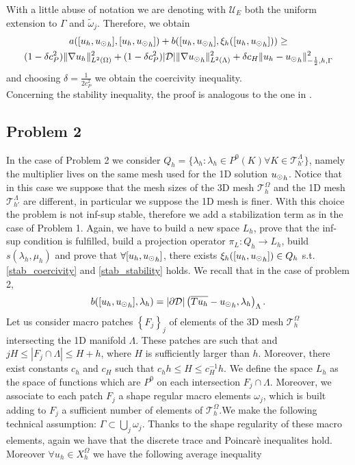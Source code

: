 With a little abuse of notation we are denoting with $\mathcal{U}_E$ both the uniform extension to $\Gamma$ and $\tilde{\omega}_j$. Therefore, we obtain
\begin{multline*}
a([u_h, {u_{\odot}}_h],[u_h, {u_{\odot}}_h] ) + b([u_h, {u_{\odot}}_h], \xi_h([u_h, {u_{\odot}}_h]))
\geq \\
(1-\delta c_P^2) \|\nabla u_h\|^2_{L^2(\Omega)} + (1- \delta c_P^2) |\mathcal{D}|\|\nabla {u_{\odot}}_h\|^2_{L^2(\Lambda)}
+\delta c_H \|u_h-{u_{\odot}}_h\|^2_{-\frac 12,h,\Gamma}
\end{multline*}
and choosing $\delta=\frac{1}{2c_P^2}$ we obtain the coercivity inequality.\\
Concerning the stability inequality, the proof is analogous to the one in \cite{burman2014}.

\subsection{Problem 2} In the case of Problem 2 we consider $Q_h=\{\lambda_{h} : \lambda_h \in P^0(K) \forall K \in \mathcal{T}^{\Lambda}_{h'}\}$, namely the multiplier lives on the same mesh used for the 1D solution ${u_{\odot}}_h$. Notice that in this case we suppose that the mesh sizes of the 3D mesh $	\mathcal{T}^{\Omega}_h$ and the 1D mesh $\mathcal{T}^{\Lambda}_{h'}$ are different, in particular we suppose the 1D mesh is finer. With this choice the problem is not inf-sup stable, therefore we add a stabilization term as in the case of Problem 1. Again, we have to build a new space $L_h$, prove that the inf-sup condition is fulfilled, build a projection operator $\pi_L: Q_h \rightarrow L_h$, build $s(\lambda_h, \mu_h)$ and prove that $\forall [u_h, {u_{\odot}}_h]$, there exists $\xi_h([u_h, {u_{\odot}}_h]) \in Q_h$ s.t. \eqref{stab_coercivity} and \eqref{stab_stability} holds. We recall that in the case of problem 2, 
\begin{equation*}
b([u_h, {u_{\odot}}_h], \lambda _h) = |\partial\mathcal{D}|\left(\overline{T u_h} - {u_{\odot}}_h, \lambda _h\right)_{\Lambda}.
\end{equation*}
Let us consider macro patches $\left\{ F_j \right\}_j$ of elements of the 3D mesh $\mathcal{T}_h^{\Omega}$ intersecting the 1D manifold $\Lambda$. These patches are such that and  $jH\leq |F_j\cap \Lambda|\leq H+h$, where $H$ is sufficiently larger than $h$. Moreover, there exist constants $c_h$ and $c_H$ such that $c_hh\leq H \leq c_H^{-1}h$. We define the space $L_h$ as the space of functions which are $P^0$ on each intersection $F_j\cap \Lambda$. Moreover, we associate to each patch $F_j$ a shape regular macro elements $\omega_j$, which is built adding to $F_j$ a sufficient number of elements of $\mathcal{T}_h^{\Omega}$.We make the following technical assumption: $\Gamma \subset \bigcup _{j} \omega_j$. Thanks to the shape regularity of these macro elements, again we have that the discrete trace and Poincarè inequalites hold. Moreover $\forall u_h \in X_h^\Omega$ we have the following average inequality 
